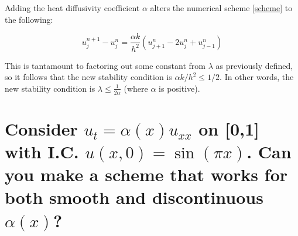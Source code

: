 \documentclass[11pt]{amsart}
\begin{document}
Adding the heat diffusivity coefficient $\alpha$ alters the numerical scheme \eqref{scheme} to the following: 

\begin{equation} 
u_j^{n+1} - u_j^n = \frac{\alpha k }{h^2}  (u_{j+1}^n - 2u_j^n + u_{j-1}^n)
\end{equation} 

This is tantamount to factoring out some constant from $\lambda$ as previously defined, so it follows that the new stability condition is  $\alpha k/h^2 \le 1/2$. In other words, the new stability condition is  $\lambda \le \frac{1}{2\alpha}$ (where $\alpha$ is positive). 


\section{Consider $u_t = \alpha(x) u_{xx}$ on [0,1] with I.C. $u(x,0)= \sin(\pi x)$. Can you make a scheme that works for both smooth and  discontinuous $\alpha(x)$? }
\end{document}
